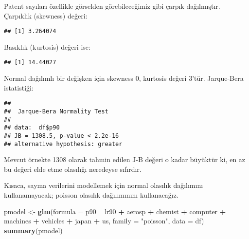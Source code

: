 \documentclass[
]{book}
\newenvironment{Shaded}{\begin{snugshade}}{\end{snugshade}}
\newcommand{\DataTypeTok}[1]{\textcolor[rgb]{0.13,0.29,0.53}{#1}}
\newcommand{\KeywordTok}[1]{\textcolor[rgb]{0.13,0.29,0.53}{\textbf{#1}}}
\newcommand{\NormalTok}[1]{#1}
\newcommand{\OperatorTok}[1]{\textcolor[rgb]{0.81,0.36,0.00}{\textbf{#1}}}
\newcommand{\StringTok}[1]{\textcolor[rgb]{0.31,0.60,0.02}{#1}}
\begin{document}
Patent sayıları özellikle görselden görebileceğimiz gibi çarpık dağılmıştır. Çarpıklık (skewness) değeri:

\begin{Shaded}
\end{Shaded}

\begin{verbatim}
## [1] 3.264074
\end{verbatim}

Basıklık (kurtosis) değeri ise:

\begin{Shaded}
\end{Shaded}

\begin{verbatim}
## [1] 14.44027
\end{verbatim}

Normal dağılımlı bir değişken için skewness 0, kurtosis değeri 3'tür. Jarque-Bera istatistiği:

\begin{Shaded}
\end{Shaded}

\begin{verbatim}
## 
##  Jarque-Bera Normality Test
## 
## data:  df$p90
## JB = 1308.5, p-value < 2.2e-16
## alternative hypothesis: greater
\end{verbatim}

Mevcut örnekte 1308 olarak tahmin edilen J-B değeri o kadar büyüktür ki, en az bu değeri elde etme olasılığı neredeyse sıfırdır.

Kısaca, sayma verilerini modellemek için normal olasılık dağılımını kullanamayacak; poisson olasılık dağılımınını kullanacağız.

\begin{Shaded}
\begin{Highlighting}[]
\NormalTok{pmodel <-}\StringTok{ }\KeywordTok{glm}\NormalTok{(}\DataTypeTok{formula =}\NormalTok{ p90 }\OperatorTok{~}\StringTok{ }\NormalTok{lr90 }\OperatorTok{+}\StringTok{ }\NormalTok{aerosp }\OperatorTok{+}\StringTok{ }\NormalTok{chemist }\OperatorTok{+}\StringTok{ }\NormalTok{computer }\OperatorTok{+}\StringTok{ }\NormalTok{machines }\OperatorTok{+}\StringTok{ }\NormalTok{vehicles }\OperatorTok{+}\StringTok{ }\NormalTok{japan }\OperatorTok{+}\StringTok{ }\NormalTok{us, }\DataTypeTok{family =} \StringTok{"poisson"}\NormalTok{, }\DataTypeTok{data =}\NormalTok{ df)}
\KeywordTok{summary}\NormalTok{(pmodel)}
\end{Highlighting}
\end{Shaded}
\end{document}
